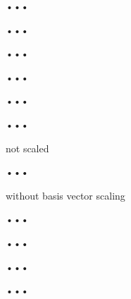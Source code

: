 \documentclass{scrartcl}
\begin{document}
\begin{figure}
	\centering
	\resizebox{.9\textwidth}{!}{}
	\caption{•••}
	\label{fig:dmat1}
\end{figure}
\begin{figure}
	\centering
	\resizebox{.9\textwidth}{!}{}
	\caption{•••}
	\label{fig:dmat2}
\end{figure}
\begin{figure}
	\centering
	\resizebox{.9\textwidth}{!}{}	
	\caption{•••}
	\label{fig:dmat3}
\end{figure}
\begin{figure}
	\centering
	\resizebox{.9\textwidth}{!}{}
	\caption{•••}
	\label{fig:dmat1_scale}
\end{figure}
\begin{figure}
	\centering
	\resizebox{.9\textwidth}{!}{}
	\caption{•••}
	\label{fig:dmat2_scale}
\end{figure}
\begin{figure}
	\centering
	\resizebox{.9\textwidth}{!}{}
	\caption{•••}
	\label{fig:dmat3_scale}
\end{figure}
\begin{figure}
	\centering
	\resizebox{.9\textwidth}{!}{}
	\caption{not scaled}
	\label{fig:watt1_noscale}
\end{figure}
\begin{figure}
	\centering
	\resizebox{.9\textwidth}{!}{}
	\caption{•••}
	\label{fig:watt1_scale}
\end{figure}
\begin{figure}
	\centering
	\resizebox{.9\textwidth}{!}{}
	\caption{without basis vector scaling}
	\label{fig:watt1_ilu0}
\end{figure}
\begin{figure}
	\centering
	\resizebox{.9\textwidth}{!}{}
	\caption{•••}
	\label{fig:pwtk_noscale}
\end{figure}
\begin{figure}
	\centering
	\resizebox{.9\textwidth}{!}{}
	\caption{•••}
	\label{fig:pwtk_scale}
\end{figure}
\begin{figure}
	\centering
	\resizebox{.9\textwidth}{!}{}
	\caption{•••}
	\label{fig:bmw7st1}
\end{figure}
\begin{figure}
	\centering
	\resizebox{.9\textwidth}{!}{}
	\caption{•••}
	\label{fig:bmw7st1_scale}
\end{figure}
\end{document}
